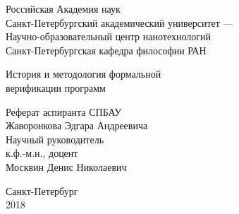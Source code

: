 \begin{titlepage}

\begin{center}
Российская Академия наук\\
Санкт-Петербургский академический университет ---\\
Научно-образовательный центр нанотехнологий\\[.5cm]
Санкт-Петербургская кафедра философии РАН
\end{center}

\vspace{2cm}

\begin{center}
\Large
История и методология формальной \\ верификации программ
\end{center}

\vspace{1cm}

\begin{flushright}
Реферат аспиранта СПБАУ\\
Жаворонкова Эдгара Андреевича\\[.5cm]

Научный руководитель\\
к.ф.-м.н., доцент\\
Москвин Денис Николаевич\\[.5cm]

\end{flushright}

\vfill

\begin{center}
Санкт-Петербург\\
2018
\end{center}

\end{titlepage}
